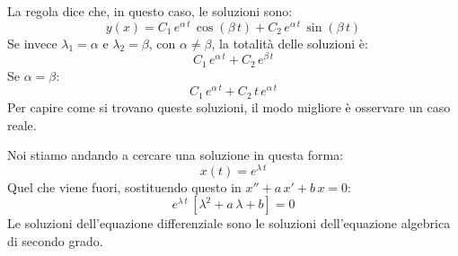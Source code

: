 La regola dice che, in questo caso, le soluzioni sono:
\[
y(x) = C_1 \, e^{\alpha \, t} \, \cos ( \beta \, t) + C_2 \, e^{\alpha \, t} \, \sin( \beta \, t )
\]
Se invece $\lambda_1 = \alpha$ e $\lambda_2 = \beta$, con $\alpha \neq \beta$, la totalit\`a delle soluzioni \`e:
\[
C_1 \, e^{\alpha \, t} + C_2 \, e^{\beta \, t}
\]
Se $\alpha = \beta$:
\[
C_1 \, e^{\alpha \, t} + C_2 \, t \, e^{\alpha \, t}
\]
Per capire come si trovano queste soluzioni, il modo migliore \`e osservare un caso reale.

Noi stiamo andando a cercare una soluzione in questa forma:
\[
x(t) = e^{\lambda \, t}
\]
Quel che viene fuori, sostituendo questo in $x'' + a \, x' + b \, x = 0$:
\[
e^{\lambda \, t} \, \left[ \lambda^2 + a \, \lambda + b \right] = 0
\]
Le soluzioni dell'equazione differenziale sono le soluzioni dell'equazione algebrica di secondo grado.




























